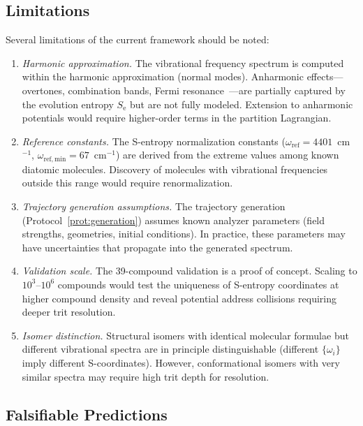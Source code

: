 \documentclass[11pt,twocolumn,a4paper]{article}
\theoremstyle{definition}
\theoremstyle{remark}
\newcommand{\Se}{S_{\mathrm{e}}}
\begin{document}
\subsection{Limitations}
\label{sec:limitations}

Several limitations of the current framework should be noted:

\begin{enumerate}
  \item \emph{Harmonic approximation.} The vibrational frequency spectrum is computed within the harmonic approximation (normal modes). Anharmonic effects---overtones, combination bands, Fermi resonance~\citep{fermi1931}---are partially captured by the evolution entropy $\Se$ but are not fully modeled. Extension to anharmonic potentials would require higher-order terms in the partition Lagrangian.

  \item \emph{Reference constants.} The S-entropy normalization constants ($\omega_{\mathrm{ref}} = 4401$~cm$^{-1}$, $\omega_{\mathrm{ref,min}} = 67$~cm$^{-1}$) are derived from the extreme values among known diatomic molecules. Discovery of molecules with vibrational frequencies outside this range would require renormalization.

  \item \emph{Trajectory generation assumptions.} The trajectory generation (Protocol~\ref{prot:generation}) assumes known analyzer parameters (field strengths, geometries, initial conditions). In practice, these parameters may have uncertainties that propagate into the generated spectrum.

  \item \emph{Validation scale.} The 39-compound validation is a proof of concept. Scaling to $10^3$--$10^6$ compounds would test the uniqueness of S-entropy coordinates at higher compound density and reveal potential address collisions requiring deeper trit resolution.

  \item \emph{Isomer distinction.} Structural isomers with identical molecular formulae but different vibrational spectra are in principle distinguishable (different $\{\omega_i\}$ imply different S-coordinates). However, conformational isomers with very similar spectra may require high trit depth for resolution.
\end{enumerate}

\subsection{Falsifiable Predictions}
\label{sec:predictions}
\end{document}
